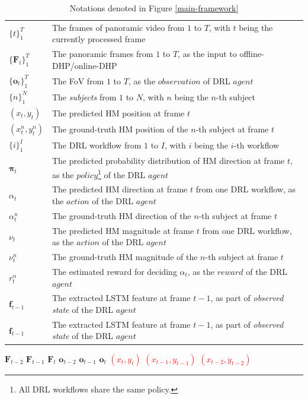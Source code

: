 \documentclass[10pt,journal,compsoc]{IEEEtran}
\begin{document}
\begin{table}
\center
\caption{Notations denoted in Figure \ref{main-framework}} \label{notation_framework}
\begin{tabular}{ll}
$\{t\}_{1}^{T}$ & The frames of panoramic video from $1$ to $T$, with $t$ being the currently processed frame \\
$\{\mathbf{F}_t\}_1^{T}$ & The panoramic frames from $1$ to $T$, as the input to offline-DHP/online-DHP\\
$\{\mathbf{o}_t\}_1^{T}$ & The FoV from $1$ to $T$, as the $observation$ of DRL $agent$ \\
$\{n\}_{1}^{N}$ & The \textit{subjects} from $1$ to $N$, with $n$ being the $n$-th subject\\
$(x_t, y_t)$ & The predicted HM position at frame $t$ \\
$(x^n_t, y^n_t)$ & The ground-truth HM position of the $n$-th subject at frame $t$ \\
$\{i\}_{1}^{I}$ & The DRL workflow from $1$ to $I$, with $i$ being the $i$-th workflow \\
$\mathbf{\pi}_t$ & The predicted probability distribution of HM direction at frame $t$, as the $policy$\footnote{All DRL workflows share the same policy.} of the DRL $agent$ \\
$\alpha_t$ & The predicted HM direction at frame $t$ from one DRL workflow, as the $action$ of the DRL $agent$ \\
$\alpha^n_t$ & The ground-truth HM direction of the $n$-th subject at frame $t$ \\
$\nu_t$ & The predicted HM magnitude at frame $t$ from one DRL workflow, as the $action$ of the DRL $agent$ \\
$\nu^n_t$ & The ground-truth HM magnitude of the $n$-th subject at frame $t$ \\
$r^{\alpha}_t$ & The estimated reward for deciding $\alpha_t$, as the $reward$ of the DRL $agent$ \\
$\mathbf{f}_{t-1}$ & The extracted LSTM feature \cite{hausknecht2015deep} at frame $t-1$,  as part of \textit{observed state} of the DRL $agent$ \\
$\mathbf{f}_{t-1}$ & The extracted LSTM feature at frame $t-1$,  as part of \textit{observed state} of the DRL $agent$ \\
\end{tabular}
\end{table}

$\mathbf{F}_{t-2}$
$\mathbf{F}_{t-1}$
$\mathbf{F}_{t}$
$\mathbf{o}_{t-2}$
$\mathbf{o}_{t-1}$
$\mathbf{o}_{t}$
\textcolor{red}{$(x_t, y_t)$}
\textcolor{red}{$(x_{t-1}, y_{t-1})$}
\textcolor{red}{$(x_{t-2}, y_{t-2})$}
\end{document}
